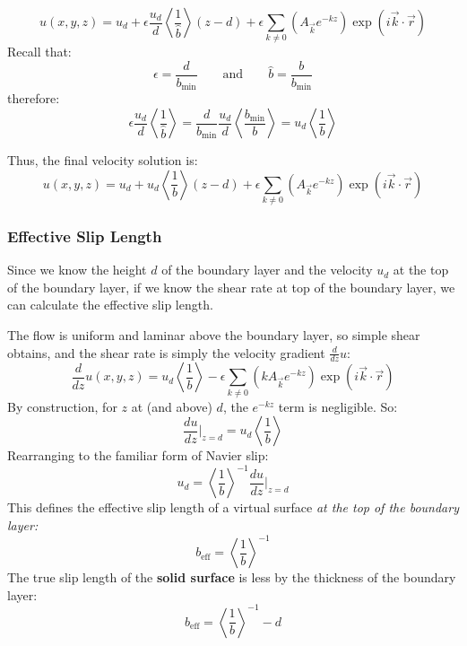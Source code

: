 \documentclass[12pt, a4paper, twoside, openright]{book}
\newcommand{\beff}{\ensuremath{b_{\mathrm{eff}}}}
\newcommand{\bmin}{\ensuremath{b_{\mathrm{min}}}}
\begin{document}
\begin{equation}
u(x,y,z) = u_d
 + \epsilon \frac{u_d}{d} \left< \frac{1}{\hat{b}} \right> (z - d)
 +  \epsilon \sum_{k \neq 0} 
\left(  A_{\vec{k}} e^{-kz} \right)
\exp(i \vec{k}\cdot \vec{r})
\end{equation}
Recall that:
\begin{equation}
\epsilon = \frac{d}{\bmin} \qquad \text{and} \qquad
\hat{b} = \frac{b}{\bmin}
\end{equation}
therefore:
\begin{equation}
\epsilon \frac{u_d}{d} \left< \frac{1}{\hat{b}} \right> 
= \frac{d}{\bmin} \frac{u_d}{d} \left< \frac{\bmin}{b} \right> 
= u_d \left< \frac{1}{b} \right>
\end{equation}

Thus, the final velocity solution is:
\begin{equation}
u(x,y,z) = u_d
 + u_d\left< \frac{1}{b} \right> (z - d)
 +  \epsilon \sum_{k \neq 0} 
\left(  A_{\vec{k}} e^{-kz} \right)
\exp(i \vec{k}\cdot \vec{r})
\end{equation}

\subsubsection*{Effective Slip Length}

Since we know the height $d$ of the boundary layer and the velocity $u_d$ at the top of the boundary layer, if we know the shear rate at top of the boundary layer, we can calculate the effective slip length.

The flow is uniform and laminar above the boundary layer, so simple shear obtains, and the shear rate is simply the velocity gradient $\frac{d}{dz} u$:
\begin{equation}
\frac{d}{dz} u(x,y,z) = 
 u_d\left< \frac{1}{b} \right>
 - \epsilon \sum_{k \neq 0} 
\left( k A_{\vec{k}} e^{-kz} \right)
\exp(i \vec{k}\cdot \vec{r})
\end{equation}
By construction, for $z$ at (and above) $d$, the $e^{-kz}$ term is negligible. So:
\begin{equation}
\frac{du}{dz} \rvert_{z=d} = u_d\left< \frac{1}{b} \right>
\end{equation}
Rearranging to the familiar form of Navier slip:
\begin{equation}
 u_d = \left< \frac{1}{b} \right>^{-1} \frac{du}{dz} \rvert_{z=d}
\end{equation}
This defines the effective slip length of a virtual surface \emph{at the top of the boundary layer:}
\begin{equation}
\beff = \left< \frac{1}{b} \right>^{-1}
\end{equation}
The true slip length of the \textbf{solid surface} is less by the thickness of the boundary layer:
\begin{equation}
\beff = \left< \frac{1}{b} \right>^{-1} - d
\end{equation}
\end{document}
